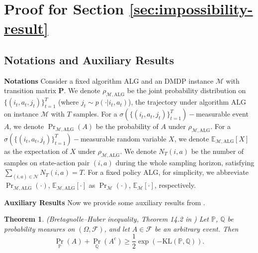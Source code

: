\documentclass[12pt]{article}
\newtheorem{theorem}{Theorem}
\begin{document}

\section{Proof for Section \ref{sec:impossibility-result}}

\subsection{Notations and Auxiliary Results}

\textbf{Notations} Consider a fixed algorithm ALG and an DMDP instance $\mathcal{M}$ with transition matrix $\boldsymbol{\text{P}}$. We denote $\rho_{\mathcal{M},\text{ALG}}$ be the joint probability distribution on $\{(i_t,a_t,j_t)\}_{t=1}^T$ (where $j_t \sim p(\cdot|i_t,a_t)$), the trajectory under algorithm ALG on instance $\mathcal{M}$ with $T$ samples. For a $\sigma(\{(i_t,a_t,j_t)\}_{t=1}^T)-$measurable event $A$, we denote $\Pr_{\mathcal{M},\text{ALG}}(A)$ be the probability of $A$ under $\rho_{\mathcal{M},\text{ALG}}$. For a $\sigma(\{(i_t,a_t,j_t)\}_{t=1}^T)-$measurable random variable $X$, we denote $\mathbb{E}_{\mathcal{M},\text{ALG}}[X]$ as the expectation of $X$ under $\rho_{\mathcal{M},\text{ALG}}$. We denote $N_{T}(i,a)$ be the number of samples on state-action pair $(i,a)$ during the whole sampling horizon, satisfying $\sum_{(i,a)\in\mathcal{N}}N_{T}(i,a) = T$. For a fixed policy ALG, for simplicity, we abbreviate $\Pr_{\mathcal{M},\text{ALG}}(\cdot)$, $\mathbb{E}_{\mathcal{M},\text{ALG}}[\cdot]$ as $\Pr_{\mathcal{M}}(\cdot)$, $\mathbb{E}_{\mathcal{M}}[\cdot]$, respectively.

\textbf{Auxiliary Results} Now we provide some auxiliary results from \cite{lattimore2020bandit}.

\begin{theorem}{(Bretagnolle–Huber inequality, Theorem 14.2 in \cite{lattimore2020bandit})}
    Let $\mathbb{P}$, $\mathbb{Q}$ be probability measures on $(\Omega,\mathcal{F})$, and let $A \in \mathcal{F}$ be an arbitrary event. Then
    \begin{equation*}
        \Pr_{\mathbb{P}}(A) + \Pr_{\mathbb{Q}}(A^c) \ge \frac{1}{2} \exp \left(- \text{KL}(\mathbb{P},\mathbb{Q}) \right).
    \end{equation*}
    \label{thm:BH-inequality}
\end{theorem}
\end{document}

